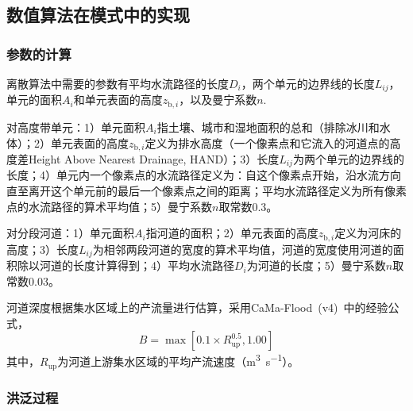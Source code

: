 \subsection{数值算法在模式中的实现}

\subsubsection{参数的计算}
离散算法中需要的参数有平均水流路径的长度$D_i$，两个单元的边界线的长度$L_{ij}$，单元的面积$A_i$和单元表面的高度$z_{\mathrm{b},i}$，以及曼宁系数$n$.

对高度带单元：1）单元面积$A_i$指土壤、城市和湿地面积的总和（排除冰川和水体）；2）单元表面的高度$z_{\mathrm{b},i}$定义为排水高度（一个像素点和它流入的河道点的高度差Height Above Nearest Drainage, HAND）；3）长度$L_{ij}$为两个单元的边界线的长度；4）单元内一个像素点的水流路径定义为：自这个像素点开始，沿水流方向直至离开这个单元前的最后一个像素点之间的距离；平均水流路径定义为所有像素点的水流路径的算术平均值；5）曼宁系数$n$取常数$0.3$。

对分段河道：1）单元面积$A_i$指河道的面积；2）单元表面的高度$z_{\mathrm{b},i}$定义为河床的高度；3）长度$L_{ij}$为相邻两段河道的宽度的算术平均值，河道的宽度使用河道的面积除以河道的长度计算得到；4）平均水流路径$D_i$为河道的长度；5）曼宁系数$n$取常数$0.03$。

河道深度根据集水区域上的产流量进行估算，采用CaMa-Flood~(v4)~\citep{yamazaki2011physically}中的经验公式，
\begin{equation}
  B = \max \left[0.1\times R_{\mathrm{up}}^{0.5}, 1.00\right]
\end{equation}
其中，$R_{\mathrm{up}}$为河道上游集水区域的平均产流速度（\unit{m^3.s^{-1}}）。

\subsubsection{洪泛过程} \label{sec:lateral_flood}

